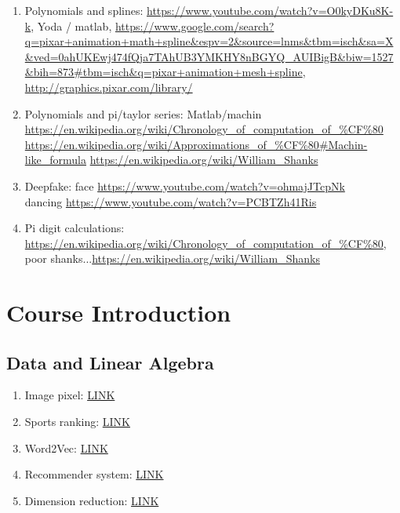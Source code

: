 \documentclass{article}
\begin{document}
\begin{enumerate}
\item Polynomials and splines: \url{https://www.youtube.com/watch?v=O0kyDKu8K-k}, Yoda / matlab, \url{https://www.google.com/search?q=pixar+animation+math+spline&espv=2&source=lnms&tbm=isch&sa=X&ved=0ahUKEwj474fQja7TAhUB3YMKHY8nBGYQ_AUIBigB&biw=1527&bih=873#tbm=isch&q=pixar+animation+mesh+spline}, \url{http://graphics.pixar.com/library/}
\item Polynomials and pi/taylor series: Matlab/machin \url{https://en.wikipedia.org/wiki/Chronology_of_computation_of_%CF%80} 
\url{https://en.wikipedia.org/wiki/Approximations_of_%CF%80#Machin-like_formula}
\url{https://en.wikipedia.org/wiki/William_Shanks}
\item Deepfake: face \url{https://www.youtube.com/watch?v=ohmajJTcpNk} \\
dancing \url{https://www.youtube.com/watch?v=PCBTZh41Ris}
\item Pi digit calculations: \url{https://en.wikipedia.org/wiki/Chronology_of_computation_of_%CF%80}, poor shanks...\url{https://en.wikipedia.org/wiki/William_Shanks}
\end{enumerate}


\section{Course Introduction}

\subsection{Data and Linear Algebra}

\begin{enumerate}
\item Image pixel: \href{https://www.google.com/search?q=image+pixel+matrix&rlz=1C1ONGR_enUS967US967&sxsrf=AOaemvJ31mY9won9-0-qx_O5-5H7UxciCA:1630978587283&source=lnms&tbm=isch&sa=X&ved=2ahUKEwiG3tLa3OvyAhXGUt8KHTpMAxEQ_AUoAXoECAEQAw&biw=1536&bih=754}
{LINK}
\item Sports ranking: \href{https://www.researchgate.net/publication/228435078_Bracketology_How_can_math_help}{LINK}
\item Word2Vec: \href{https://www.google.com/search?q=word2vec&rlz=1C1ONGR_enUS967US967&hl=en&sxsrf=AOaemvL1k96_UWGmiotFxaHvOiRl0vL5lA:1630979200038&source=lnms&tbm=isch&sa=X&ved=2ahUKEwjKmOr-3uvyAhXdF1kFHYV1CSsQ_AUoAnoECAEQBA&biw=1536&bih=754&dpr=1.25}{LINK}
\item Recommender system: \href{https://www.google.com/search?q=movie+recommendations+matrix&tbm=isch&ved=2ahUKEwjtpI-u3-vyAhUNz6wKHfnVCksQ2-cCegQIABAA&oq=movie+recommendations+matrix&gs_lcp=CgNpbWcQA1CgAVjQBWCeB2gAcAB4AYABogKIAYoFkgEFMy4xLjGYAQCgAQGqAQtnd3Mtd2l6LWltZ8ABAQ&sclient=img&ei=48Q2Ya2nDI2eswX5q6vYBA&bih=754&biw=1536&rlz=1C1ONGR_enUS967US967#imgrc=1Febn9D40fFPwM}{LINK}
\item Dimension reduction: \href{http://projector.tensorflow.org/}{LINK}
\end{enumerate}
\end{document}
